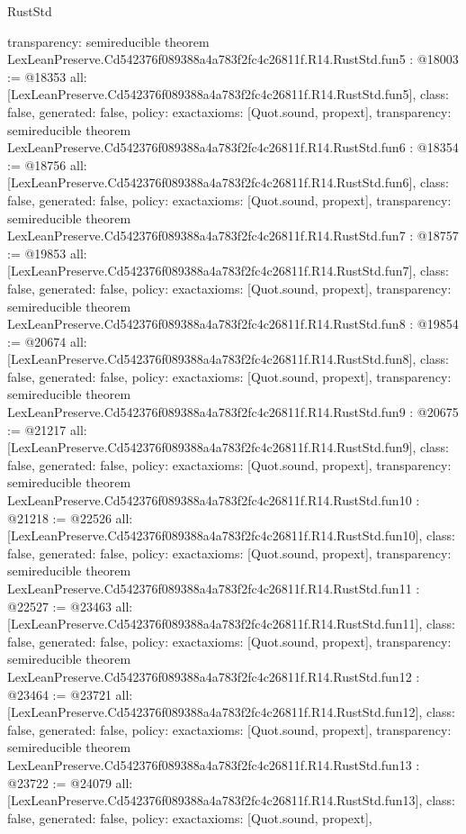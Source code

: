 \begin{lexlean}{RustStd}
\begin{coremodule}
{  transparency: semireducible
}
theorem LexLeanPreserve.Cd542376f089388a4a783f2fc4c26811f.R14.RustStd.fun5 : @18003 := @18353 {
  all: [LexLeanPreserve.Cd542376f089388a4a783f2fc4c26811f.R14.RustStd.fun5],
  class: false,
  generated: false,
  policy: exact{axioms: [Quot.sound, propext]},
  transparency: semireducible
}
theorem LexLeanPreserve.Cd542376f089388a4a783f2fc4c26811f.R14.RustStd.fun6 : @18354 := @18756 {
  all: [LexLeanPreserve.Cd542376f089388a4a783f2fc4c26811f.R14.RustStd.fun6],
  class: false,
  generated: false,
  policy: exact{axioms: [Quot.sound, propext]},
  transparency: semireducible
}
theorem LexLeanPreserve.Cd542376f089388a4a783f2fc4c26811f.R14.RustStd.fun7 : @18757 := @19853 {
  all: [LexLeanPreserve.Cd542376f089388a4a783f2fc4c26811f.R14.RustStd.fun7],
  class: false,
  generated: false,
  policy: exact{axioms: [Quot.sound, propext]},
  transparency: semireducible
}
theorem LexLeanPreserve.Cd542376f089388a4a783f2fc4c26811f.R14.RustStd.fun8 : @19854 := @20674 {
  all: [LexLeanPreserve.Cd542376f089388a4a783f2fc4c26811f.R14.RustStd.fun8],
  class: false,
  generated: false,
  policy: exact{axioms: [Quot.sound, propext]},
  transparency: semireducible
}
theorem LexLeanPreserve.Cd542376f089388a4a783f2fc4c26811f.R14.RustStd.fun9 : @20675 := @21217 {
  all: [LexLeanPreserve.Cd542376f089388a4a783f2fc4c26811f.R14.RustStd.fun9],
  class: false,
  generated: false,
  policy: exact{axioms: [Quot.sound, propext]},
  transparency: semireducible
}
theorem LexLeanPreserve.Cd542376f089388a4a783f2fc4c26811f.R14.RustStd.fun10 : @21218 := @22526 {
  all: [LexLeanPreserve.Cd542376f089388a4a783f2fc4c26811f.R14.RustStd.fun10],
  class: false,
  generated: false,
  policy: exact{axioms: [Quot.sound, propext]},
  transparency: semireducible
}
theorem LexLeanPreserve.Cd542376f089388a4a783f2fc4c26811f.R14.RustStd.fun11 : @22527 := @23463 {
  all: [LexLeanPreserve.Cd542376f089388a4a783f2fc4c26811f.R14.RustStd.fun11],
  class: false,
  generated: false,
  policy: exact{axioms: [Quot.sound, propext]},
  transparency: semireducible
}
theorem LexLeanPreserve.Cd542376f089388a4a783f2fc4c26811f.R14.RustStd.fun12 : @23464 := @23721 {
  all: [LexLeanPreserve.Cd542376f089388a4a783f2fc4c26811f.R14.RustStd.fun12],
  class: false,
  generated: false,
  policy: exact{axioms: [Quot.sound, propext]},
  transparency: semireducible
}
theorem LexLeanPreserve.Cd542376f089388a4a783f2fc4c26811f.R14.RustStd.fun13 : @23722 := @24079 {
  all: [LexLeanPreserve.Cd542376f089388a4a783f2fc4c26811f.R14.RustStd.fun13],
  class: false,
  generated: false,
  policy: exact{axioms: [Quot.sound, propext]},
}
\end{coremodule}
\end{lexlean}
